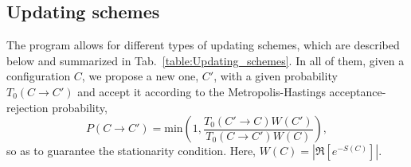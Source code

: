 
\subsection{Updating schemes}\label{sec:updating}
%
The program allows for different types of updating schemes, which are described below and summarized in Tab.~\ref{table:Updating_schemes}. In all of them, given a configuration $C$, we propose a new one, $C'$, with a given probability $T_0(C \rightarrow C')$  and accept it according to   the  Metropolis-Hastings   acceptance-rejection probability, 
\begin{equation}
	P(C \rightarrow C') =  \text{min}  \left( 1, \frac{T_0(C' \rightarrow C) W(C')}{T_0(C \rightarrow C') W(C)} \right),
\end{equation}
so as to guarantee the stationarity condition.  Here, $ W(C) = \left| \Re \left[ e^{-S(C)} \right] \right| $. 

